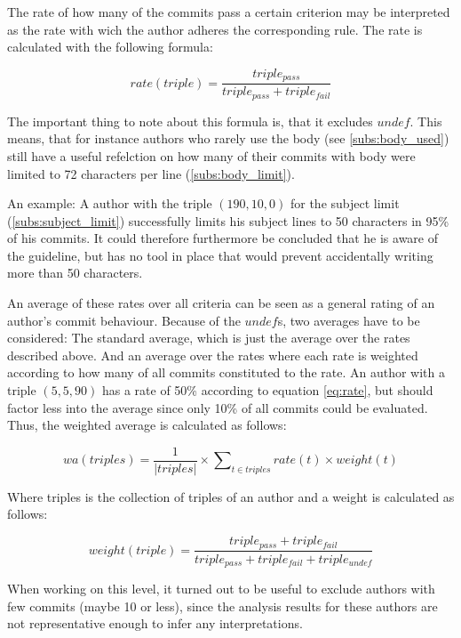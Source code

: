 The rate of how many of the commits pass a certain criterion may be interpreted as the rate with wich the author adheres the corresponding rule. The rate is calculated with the following formula:

\begin{equation}
  \label{eq:rate}
  rate(triple) = \frac{triple_{pass}}{triple_{pass} + triple_{fail}}
\end{equation}

The important thing to note about this formula is, that it excludes $undef$. This means, that for instance authors who rarely use the body (see \ref{subs:body_used}) still have a useful refelction on how many of their commits with body were limited to 72 characters per line (\ref{subs:body_limit}).

An example: A author with the triple $(190, 10, 0)$ for the subject limit (\ref{subs:subject_limit}) successfully limits his subject lines to 50 characters in 95\% of his commits. It could therefore furthermore be concluded that he is aware of the guideline, but has no tool in place that would prevent accidentally writing more than 50 characters.

An average of these rates over all criteria can be seen as a general rating of an author's commit behaviour. Because of the $undef$s, two averages have to be considered: The standard average, which is just the average over the rates described above. And an average over the rates where each rate is weighted according to how many of all commits constituted to the rate. An author with a triple $(5, 5, 90)$ has a rate of 50\% according to equation \ref{eq:rate}, but should factor less into the average since only 10\% of all commits could be evaluated. Thus, the weighted average is calculated as follows:

\begin{equation}
  \label{eq:weightedAverage}
  wa(triples) = \frac{1}{|triples|} \times \sum\nolimits_{t \in triples} rate(t) \times weight(t)
\end{equation}

Where triples is the collection of triples of an author and a weight is calculated as follows:

\begin{equation}
  weight(triple) = \frac{triple_{pass} + triple_{fail}}{triple_{pass} + triple_{fail} + triple_{undef}}
\end{equation}

When working on this level, it turned out to be useful to exclude authors with few commits (maybe 10 or less), since the analysis results for these authors are not representative enough to infer any interpretations.

